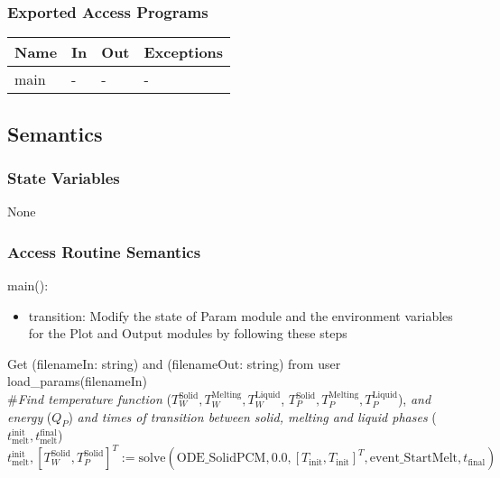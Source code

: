\documentclass[12pt, titlepage]{article}
\begin{document}
\subsubsection{Exported Access Programs}

\begin{center}
\begin{tabular}{p{2cm} p{4cm} p{4cm} p{2cm}}
\hline
\textbf{Name} & \textbf{In} & \textbf{Out} & \textbf{Exceptions} \\
\hline
main & - & - & - \\
\hline
\end{tabular}
\end{center}

\subsection{Semantics}

\subsubsection{State Variables}

None

\subsubsection{Access Routine Semantics}

\noindent main():
\begin{itemize}
\item transition: Modify the state of Param module and the environment variables
  for the Plot and Output modules by following these steps\\
\end{itemize}

\noindent Get (filenameIn: string) and (filenameOut: string) from user\\

\noindent load\_params(filenameIn)\\

\noindent \#\textit{Find temperature function} ($T_W^\text{Solid},
  T_W^\text{Melting}, T_W^\text{Liquid}$, $T_P^\text{Solid},
  T_P^\text{Melting}, T_P^\text{Liquid}$), \textit{and energy} ($Q_P$) \textit{and times of transition between solid,
  melting and liquid phases} ($t_\text{melt}^{\text{init}}, t_\text{melt}^{\text{final}}$)\\

\noindent $t_\text{melt}^\text{init}, [T_W^{\text{Solid}}, T_P^{\text{Solid}}]^T := \text{solve}(\text{ODE\_SolidPCM}, 0.0,
[T_\text{init}, T_\text{init}]^T, \text{event\_StartMelt} , t_\text{final})$\\
\end{document}
